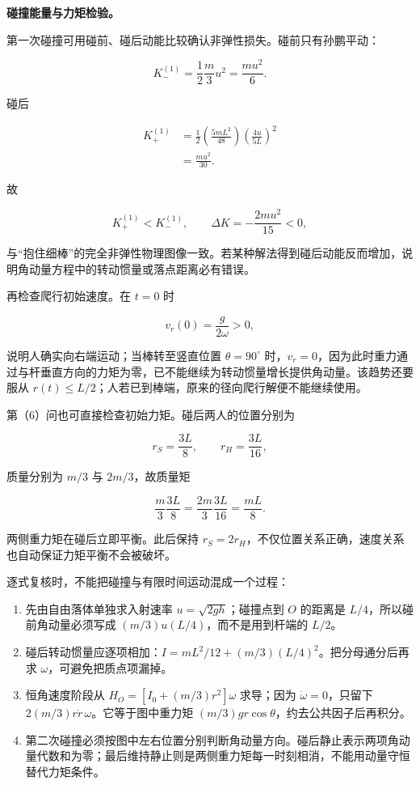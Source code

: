 \documentclass[12pt,a4paper,UTF8]{ctexart}
\newcommand{\tightlist}{\setlength{\itemsep}{0pt}\setlength{\parskip}{0pt}}
\begin{document}
\textbf{碰撞能量与力矩检验。}

第一次碰撞可用碰前、碰后动能比较确认非弹性损失。碰前只有孙鹏平动：

\[K_-^{(1)}=\frac12\frac m3u^2=\frac{mu^2}{6}.\]

碰后

\[
\begin{aligned}
K_+^{(1)}
&=\frac12\left(\frac{5mL^2}{48}\right)
\left(\frac{4u}{5L}\right)^2\\
&=\frac{mu^2}{30}.
\end{aligned}
\]

故

\[K_+^{(1)}<K_-^{(1)},\qquad
\Delta K=-\frac{2mu^2}{15}<0,\]

与``抱住细棒''的完全非弹性物理图像一致。若某种解法得到碰后动能反而增加，说明角动量方程中的转动惯量或落点距离必有错误。

再检查爬行初始速度。在 \(t=0\) 时

\[v_r(0)=\frac{g}{2\omega}>0,\]

说明人确实向右端运动；当棒转至竖直位置 \(\theta=90^\circ\)
时，\(v_r=0\)，因为此时重力通过与杆垂直方向的力矩为零，已不能继续为转动惯量增长提供角动量。该趋势还要服从
\(r(t)\le L/2\)；人若已到棒端，原来的径向爬行解便不能继续使用。

第（6）问也可直接检查初始力矩。碰后两人的位置分别为

\[r_S=\frac{3L}{8},\qquad r_H=\frac{3L}{16},\]

质量分别为 \(m/3\) 与 \(2m/3\)，故质量矩

\[\frac m3\frac{3L}{8}=\frac{2m}{3}\frac{3L}{16}=\frac{mL}{8}.\]

两侧重力矩在碰后立即平衡。此后保持
\(r_S=2r_H\)，不仅位置关系正确，速度关系也自动保证力矩平衡不会被破坏。

逐式复核时，不能把碰撞与有限时间运动混成一个过程：

\begin{enumerate}
\def\labelenumi{\arabic{enumi}.}
\tightlist
\item
  先由自由落体单独求入射速率 \(u=\sqrt{2gh}\)；碰撞点到 \(O\) 的距离是
  \(L/4\)，所以碰前角动量必须写成 \((m/3)u(L/4)\)，而不是用到杆端的
  \(L/2\)。
\item
  碰后转动惯量应逐项相加：\(I= mL^2/12+(m/3)(L/4)^2\)。把分母通分后再求
  \(\omega\)，可避免把质点项漏掉。
\item
  恒角速度阶段从 \(H_O=[I_0+(m/3)r^2]\omega\) 求导；因为
  \(\dot\omega=0\)，只留下 \(2(m/3)r\dot r\,\omega\)。它等于图中重力矩
  \((m/3)gr\cos\theta\)，约去公共因子后再积分。
\item
  第二次碰撞必须按图中左右位置分别判断角动量方向。碰后静止表示两项角动量代数和为零；最后维持静止则是两侧重力矩每一时刻相消，不能用动量守恒替代力矩条件。
\end{enumerate}
\end{document}
